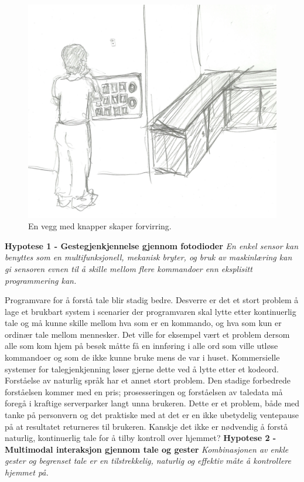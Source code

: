 \begin{figure}
\centering
\includegraphics[scale=0.1]{fig/buttons}
\caption{En vegg med knapper skaper forvirring.}
\label{fig:panel}
\end{figure}\newline\newline
\textbf{Hypotese 1 - Gestegjenkjennelse gjennom fotodioder}\newline
\emph{En enkel sensor kan benyttes som en multifunksjonell, mekanisk bryter, og bruk av maskinlæring kan gi sensoren evnen til å skille mellom flere kommandoer enn eksplisitt programmering kan.}\newline

Programvare for å forstå tale blir stadig bedre. Desverre er det et stort problem å lage et brukbart system i scenarier der programvaren skal lytte etter kontinuerlig tale og må kunne skille mellom hva som er en kommando, og hva som kun er ordinær tale mellom mennesker. Det ville for eksempel vært et problem dersom alle som kom hjem på besøk måtte få en innføring i alle ord som ville utløse kommandoer og som de ikke kunne bruke mens de var i huset. Kommersielle systemer for talegjenkjenning løser gjerne dette ved å lytte etter et kodeord. Forståelse av naturlig språk har et annet stort problem. Den stadige forbedrede forståelsen kommer med en pris; prosesseringen og forståelsen av taledata må foregå i kraftige serverparker langt unna brukeren. Dette er et problem, både med tanke på personvern og det praktiske med at det er en ikke ubetydelig ventepause på at resultatet returneres til brukeren. Kanskje det ikke er nødvendig å forstå naturlig, kontinuerlig tale for å tilby kontroll over hjemmet? \newline\newline
\textbf{Hypotese 2 - Multimodal interaksjon gjennom tale og gester}\newline
\emph{Kombinasjonen av enkle gester og begrenset tale er en tilstrekkelig, naturlig og effektiv måte å kontrollere hjemmet på.}\newline

